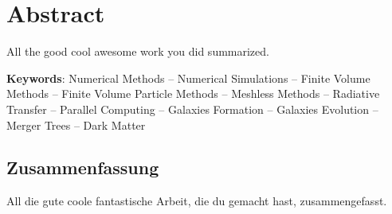 \cleardoublepage
\chapter*{Abstract}

All the good cool awesome work you did summarized.

\textbf{Keywords}: Numerical Methods -- Numerical Simulations -- Finite Volume Methods -- Finite
Volume Particle Methods -- Meshless Methods -- Radiative Transfer -- Parallel Computing -- Galaxies
Formation -- Galaxies Evolution -- Merger Trees -- Dark Matter






\cleardoublepage

\begin{otherlanguage}{german}
\chapter*{Zusammenfassung}

All die gute coole fantastische Arbeit, die du gemacht hast, zusammengefasst.

\end{otherlanguage}
